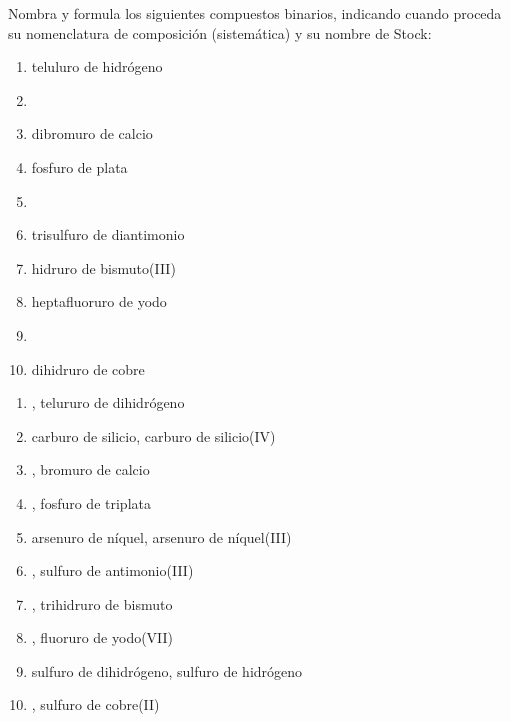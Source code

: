 \begin{exercise}[
    tags    = {inorgánica,compuestos binarios,sales binarias,sales},
    topics  = {química inorgánica,formulación,nomenclatura},
    source  = {SAN Formulación, p26, e30},
  ]
  Nombra y formula los siguientes compuestos binarios, indicando cuando proceda su nomenclatura de composición (sistemática) y su nombre de Stock:

  \begin{enumerate}
    \item teluluro de hidrógeno
    \item {}
    \item dibromuro de calcio
    \item fosfuro de plata
    \item {}
    \item trisulfuro de diantimonio
    \item hidruro de bismuto(III)
    \item heptafluoruro de yodo
    \item {}
    \item dihidruro de cobre
  \end{enumerate}
\end{exercise}

\begin{solution}
  \begin{enumerate}
    \item {}, telururo de dihidrógeno
    \item carburo de silicio, carburo de silicio(IV)
    \item {}, bromuro de calcio
    \item {}, fosfuro de triplata
    \item arsenuro de níquel, arsenuro de níquel(III)
    \item {}, sulfuro de antimonio(III)
    \item {}, trihidruro de bismuto
    \item {}, fluoruro de yodo(VII)
    \item sulfuro de dihidrógeno, sulfuro de hidrógeno
    \item {}, sulfuro de cobre(II)
  \end{enumerate}
\end{solution}




